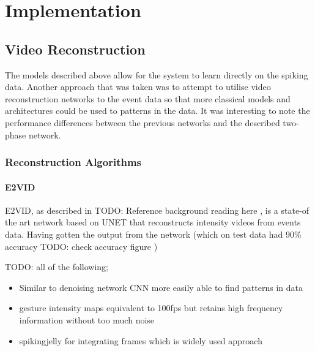 \chapter{Implementation} \label{chap:implementation}




\section{Video Reconstruction}

The models described above allow for the system to learn directly on the spiking data. Another approach that was taken was to attempt to utilise video reconstruction networks to the event data so that more classical models and architectures could be used to patterns in the data. It was interesting to note the performance differences between the previous networks and the described two-phase network.

\subsection{Reconstruction Algorithms}

\subsubsection{E2VID}

E2VID, as described in \color{red} TODO: Reference background reading here \color{black}, is a state-of the art network based on UNET that reconstructs intensity videos from events data. Having gotten the output from the network (which on test data had 90\% accuracy \color{red} TODO: check accuracy figure \color{black})

\color{red} TODO: all of the following;

\begin{itemize}
    \item Similar to denoising network CNN more easily able to find patterns in data
    \item gesture intensity maps equivalent to 100fps but retains high frequency information without too much noise
    \item spikingjelly for integrating frames which is widely used approach
\end{itemize}

